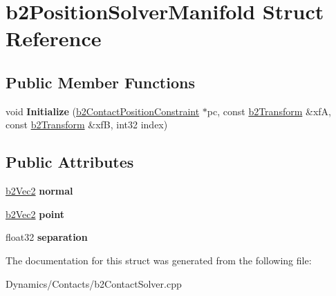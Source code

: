 \hypertarget{structb2PositionSolverManifold}{}\section{b2\+Position\+Solver\+Manifold Struct Reference}
\label{structb2PositionSolverManifold}
\subsection*{Public Member Functions}
\begin{DoxyCompactItemize}
\item 
\mbox{\label{structb2PositionSolverManifold_affdfc2c9f455008e865b2dd6947796fa}} 
void {\bfseries Initialize} (\mbox{\hyperlink{structb2ContactPositionConstraint}{b2\+Contact\+Position\+Constraint}} $\ast$pc, const \mbox{\hyperlink{structb2Transform}{b2\+Transform}} \&xfA, const \mbox{\hyperlink{structb2Transform}{b2\+Transform}} \&xfB, int32 index)
\end{DoxyCompactItemize}
\subsection*{Public Attributes}
\begin{DoxyCompactItemize}
\item 
\mbox{\label{structb2PositionSolverManifold_a4a1073e69ab49f55b7013d4aef96fe1c}} 
\mbox{\hyperlink{structb2Vec2}{b2\+Vec2}} {\bfseries normal}
\item 
\mbox{\label{structb2PositionSolverManifold_a9b7a88173cc0295e2883e2ac8b7c46f2}} 
\mbox{\hyperlink{structb2Vec2}{b2\+Vec2}} {\bfseries point}
\item 
\mbox{\label{structb2PositionSolverManifold_a9dd76b0c774238d3e3745d139cf6eea4}} 
float32 {\bfseries separation}
\end{DoxyCompactItemize}


The documentation for this struct was generated from the following file\+:\begin{DoxyCompactItemize}
\item 
Dynamics/\+Contacts/b2\+Contact\+Solver.\+cpp\end{DoxyCompactItemize}
